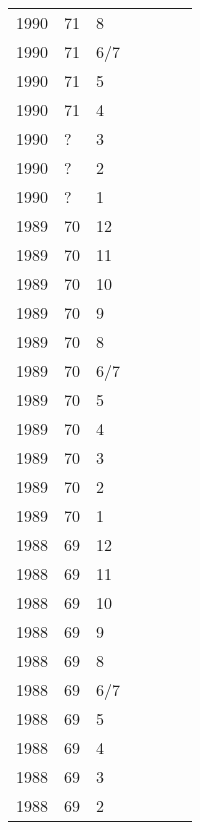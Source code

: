 \begin{longtable}{ |l|l|l|l|p{2.7cm}|l|p{2cm}| }
 1990 & 71 &     8 &         &                &  & \\
 1990 & 71 &   6/7 &         &                &  & \\
 1990 & 71 &     5 &         &                &   & \\
 1990 & 71 &     4 &         &                &  & \\
 1990 & ?  &     3 &         &                &  & \\
 1990 & ?  &     2 &         &                &  & \\
 1990 & ?  &     1 &         &                &  & \\
 1989 & 70 &    12 &         &                &   & \\
 1989 & 70 &    11 &         &                &  & \\
 1989 & 70 &    10 &         &                &  & \\
 1989 & 70 &     9 &         &                &  & \\
 1989 & 70 &     8 &         &                &  & \\
 1989 & 70 &   6/7 &         &                &  & \\
 1989 & 70 &     5 &         &                &  & \\
 1989 & 70 &     4 &         &                &  & \\
 1989 & 70 &     3 &         &                &  & \\
 1989 & 70 &     2 &         &                &  & \\
 1989 & 70 &     1 &         &                &  & \\
 1988 & 69 &    12 &         &                &  & \\
 1988 & 69 &    11 &         &                &  & \\
 1988 & 69 &    10 &         &                &  & \\
 1988 & 69 &     9 &         &                &  & \\
 1988 & 69 &     8 &         &                &  & \\
 1988 & 69 &   6/7 &         &                &  & \\
 1988 & 69 &     5 &         &                &  & \\
 1988 & 69 &     4 &         &                &  & \\
 1988 & 69 &     3 &         &                &  & \\
 1988 & 69 &     2 &         &                &  & \\

\end{longtable}
